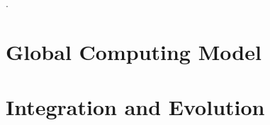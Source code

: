 \documentclass{dune} %
\begin{document}
. %
\cleardoublepage

\cleardoublepage

\cleardoublepage

\cleardoublepage

\cleardoublepage

\part{Global Computing Model  }\label{part:model} %

\cleardoublepage


\cleardoublepage


\cleardoublepage


\cleardoublepage


\cleardoublepage



\cleardoublepage


%

%

%


\part{Integration and Evolution}


\cleardoublepage


\cleardoublepage




\cleardoublepage
\end{document}
